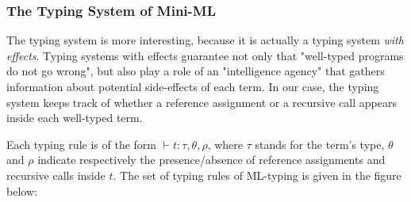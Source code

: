 \documentclass[a4paper,11pt,oneside]{article}
\theoremstyle{plain}
\begin{document}
\subsubsection*{The Typing System of Mini-ML } 
	
	The typing system is more interesting, because it is actually a typing system \textit{with effects}. 	
	Typing systems with effects guarantee not only that "well-typed programs do not go wrong", but also play a role of an "intelligence agency" that gathers information about potential side-effects of each term. 
	In our case, the typing system keeps track of whether a reference assignment or a recursive call appears inside each well-typed term.		
	
	Each typing rule is of the form $\vdash t : \tau, \theta, \rho$,  where $\tau$ stands for the term's type, $\theta$ and $\rho$ indicate respectively the presence/absence of reference assignments and recursive calls inside $t$.	 
	The set of typing rules of ML-typing is given in the figure below:	
\end{document}
